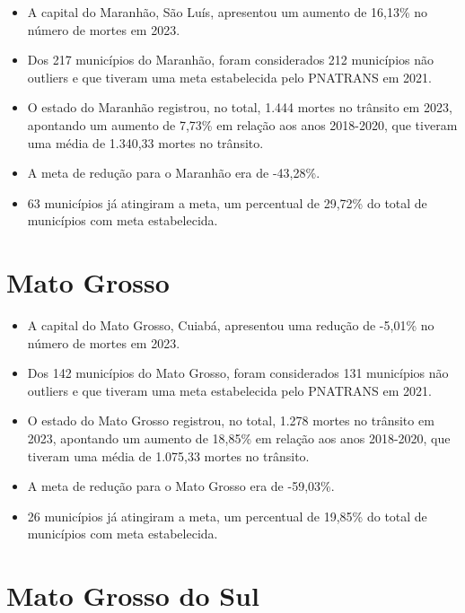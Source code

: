 \documentclass[
  letterpaper,
  DIV=11,
  numbers=noendperiod]{scrreprt}
\begin{document}
\begin{itemize}
\item
  A capital do Maranhão, São Luís, apresentou um aumento de 16,13\% no
  número de mortes em 2023.
\item
  Dos 217 municípios do Maranhão, foram considerados 212 municípios não
  outliers e que tiveram uma meta estabelecida pelo PNATRANS em 2021.
\item
  O estado do Maranhão registrou, no total, 1.444 mortes no trânsito em
  2023, apontando um aumento de 7,73\% em relação aos anos 2018-2020,
  que tiveram uma média de 1.340,33 mortes no trânsito.
\item
  A meta de redução para o Maranhão era de -43,28\%.
\item
  63 municípios já atingiram a meta, um percentual de 29,72\% do total
  de municípios com meta estabelecida.
\end{itemize}

\section{Mato Grosso}\label{mato-grosso}

\begin{itemize}
\item
  A capital do Mato Grosso, Cuiabá, apresentou uma redução de -5,01\% no
  número de mortes em 2023.
\item
  Dos 142 municípios do Mato Grosso, foram considerados 131 municípios
  não outliers e que tiveram uma meta estabelecida pelo PNATRANS em
  2021.
\item
  O estado do Mato Grosso registrou, no total, 1.278 mortes no trânsito
  em 2023, apontando um aumento de 18,85\% em relação aos anos
  2018-2020, que tiveram uma média de 1.075,33 mortes no trânsito.
\item
  A meta de redução para o Mato Grosso era de -59,03\%.
\item
  26 municípios já atingiram a meta, um percentual de 19,85\% do total
  de municípios com meta estabelecida.
\end{itemize}

\section{Mato Grosso do Sul}\label{mato-grosso-do-sul}
\end{document}

